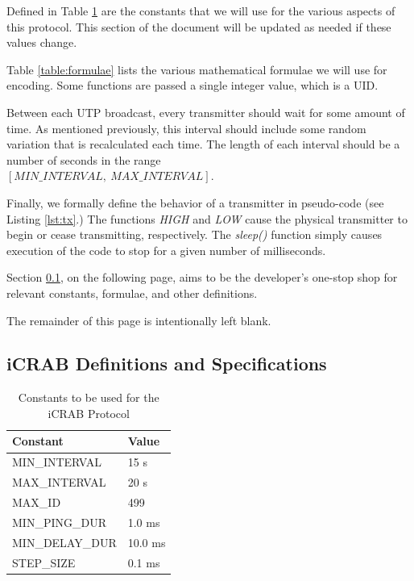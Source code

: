 \documentclass[12pt]{article}
\begin{document}
Defined in Table \ref{table:constants} are the constants that we will use for
the various aspects of this protocol.
This section of the document will be updated as needed if these values
change.

Table \ref{table:formulae} lists the various mathematical formulae we will
use for encoding.
Some functions are passed a single integer value, which is a UID.

Between each UTP broadcast, every transmitter should wait for some amount
of time.
As mentioned previously, this interval should include some random variation
that is recalculated each time.
The length of each interval should be a number of seconds in the range\\
$[MIN\_INTERVAL,\ MAX\_INTERVAL]$.

Finally, we formally define the behavior of a transmitter in pseudo-code
(see Listing \ref{lst:tx}.)
The functions {\em HIGH} and {\em LOW} cause the physical transmitter to begin
or cease transmitting, respectively.
The {\em sleep()} function simply causes execution of the code to stop for a
given number of milliseconds.

Section \ref{specs}, on the following page,
aims to be the developer's one-stop shop for relevant constants,
formulae, and other definitions.

\vfill

\begin{center}
The remainder of this page is intentionally left blank.
\end{center}

\vfill

\newpage
\subsection{iCRAB Definitions and Specifications} \label{specs}

\begin{table}[ht]
\centering
\begin{tabular}{|l|l|}
\hline
Constant & Value \\
\hline
MIN\_INTERVAL	&	15 s		\\
MAX\_INTERVAL	&	20 s		\\
MAX\_ID			&	499		\\
MIN\_PING\_DUR	&	1.0 ms	\\
MIN\_DELAY\_DUR	&	10.0 ms	\\
STEP\_SIZE		&	0.1	ms	\\
\hline
\end{tabular}
\caption{Constants to be used for the iCRAB Protocol}\label{table:constants}
\end{table}
\end{document}

